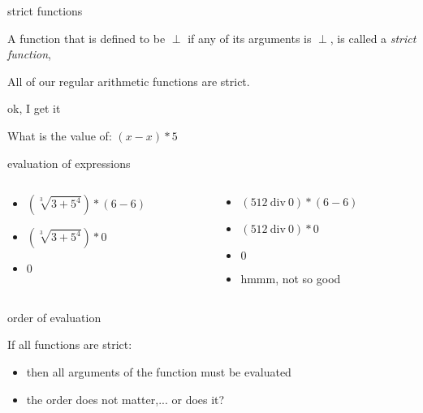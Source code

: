 \begin{frame}{strict functions}

\vspace{20pt}\hspace{80pt}\parbox[l][60pt][l]{240pt}{

A function that is defined to be $\perp$ if any of its arguments is $\perp$, is called a {\em strict function},

\vspace{20pt}All of our regular arithmetic functions are strict.
}

\end{frame}

\begin{frame}{ok, I get it}


\vspace{20pt}\hspace{40pt}What is the value of: $(x - x) * 5$

\end{frame}

\begin{frame}{evaluation of expressions}
\begin{columns}
 \begin{column}{0.5\linewidth}
  \begin{itemize}
   \pause \item $(\sqrt[3]{3 + 5^4}) * (6 - 6)$
   \pause \item $(\sqrt[3]{3 + 5^4}) * 0$
   \pause \item $0$
  \end{itemize}   
 \end{column}
 \begin{column}{0.5\linewidth}
  \begin{itemize}
   \pause \item $(512\ \mathrm{div}\ 0) * (6 - 6)$
   \pause \item $(512\ \mathrm{div}\ 0) * 0$
   \pause \item $0$
   \pause \item hmmm, not so good
  \end{itemize}   
 \end{column}
\end{columns}
\end{frame}

\begin{frame}{order of evaluation}

\vspace{20pt}\hspace{60pt}\parbox[l][60pt][l]{300pt}{If all functions are strict:
\begin{itemize}
\pause \item then all arguments of the function must be evaluated
\pause \item the order does not matter\pause ,... or does it?
\end{itemize}}

\end{frame}

